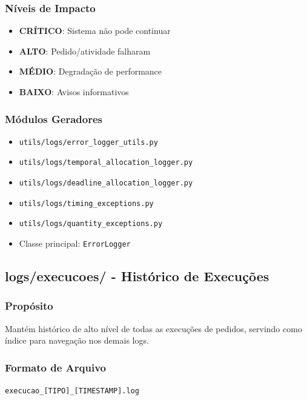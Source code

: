 \documentclass[11pt,a4paper]{article}
\begin{document}
\subsubsection{Níveis de Impacto}

\begin{itemize}
    \item \textbf{CRÍTICO}: Sistema não pode continuar
    \item \textbf{ALTO}: Pedido/atividade falharam
    \item \textbf{MÉDIO}: Degradação de performance
    \item \textbf{BAIXO}: Avisos informativos
\end{itemize}

\subsubsection{Módulos Geradores}

\begin{itemize}
    \item \texttt{utils/logs/error\_logger\_utils.py}
    \item \texttt{utils/logs/temporal\_allocation\_logger.py}
    \item \texttt{utils/logs/deadline\_allocation\_logger.py}
    \item \texttt{utils/logs/timing\_exceptions.py}
    \item \texttt{utils/logs/quantity\_exceptions.py}
    \item Classe principal: \texttt{ErrorLogger}
\end{itemize}

\subsection{logs/execucoes/ - Histórico de Execuções}

\subsubsection{Propósito}

Mantém histórico de alto nível de todas as execuções de pedidos, servindo como índice para navegação nos demais logs.

\subsubsection{Formato de Arquivo}

\texttt{execucao\_[TIPO]\_[TIMESTAMP].log}
\end{document}
